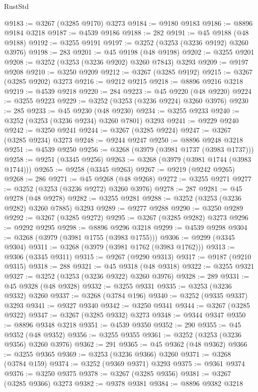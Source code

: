 \begin{lexlean}{RustStd}
\begin{coremodule}
{\begin{coremodule}
{{{{{{{{{{{{{{{{{{{{{{{{{{{{{{{{{{{{{{{@9183 := @3267 (@3285 @9170) @3273
@9184 := @9180 @9183
@9186 := @8896 @9184 @3218
@9187 := @4539 @9186
@9188 := 282
@9191 := @45 @9188 (@48 @9188)
@9192 := @3255 @9191
@9197 := @3252 (@3253 (@3236 @9192) @3260 @3976)
@9198 := 283
@9201 := @45 @9198 (@48 @9198)
@9202 := @3255 @9201
@9208 := @3252 (@3253 (@3236 @9202) @3260 @7843) @3293
@9209 := @9197 @9208
@9210 := @3250 @9209
@9212 := @3267 (@3285 @9192)
@9215 := @3267 (@3285 @9202) @3273
@9216 := @9212 @9215
@9218 := @8896 @9216 @3218
@9219 := @4539 @9218
@9220 := 284
@9223 := @45 @9220 (@48 @9220)
@9224 := @3255 @9223
@9229 := @3252 (@3253 (@3236 @9224) @3260 @3976)
@9230 := 285
@9233 := @45 @9230 (@48 @9230)
@9234 := @3255 @9233
@9240 := @3252 (@3253 (@3236 @9234) @3260 @7801) @3293
@9241 := @9229 @9240
@9242 := @3250 @9241
@9244 := @3267 (@3285 @9224)
@9247 := @3267 (@3285 @9234) @3273
@9248 := @9244 @9247
@9250 := @8896 @9248 @3218
@9251 := @4539 @9250
@9256 := @3268 (@3979 (@3981 @1737 (@3983 @1737)))
@9258 := @9251 (@3345 @9256)
@9263 := @3268 (@3979 (@3981 @1744 (@3983 @1744)))
@9265 := @9258 (@3345 @9263)
@9267 := @9219 (@9242 @9265)
@9268 := 286
@9271 := @45 @9268 (@48 @9268)
@9272 := @3255 @9271
@9277 := @3252 (@3253 (@3236 @9272) @3260 @3976)
@9278 := 287
@9281 := @45 @9278 (@48 @9278)
@9282 := @3255 @9281
@9288 := @3252 (@3253 (@3236 @9282) @3260 @7885) @3293
@9289 := @9277 @9288
@9290 := @3250 @9289
@9292 := @3267 (@3285 @9272)
@9295 := @3267 (@3285 @9282) @3273
@9296 := @9292 @9295
@9298 := @8896 @9296 @3218
@9299 := @4539 @9298
@9304 := @3268 (@3979 (@3981 @1755 (@3983 @1755)))
@9306 := @9299 (@3345 @9304)
@9311 := @3268 (@3979 (@3981 @1762 (@3983 @1762)))
@9313 := @9306 (@3345 @9311)
@9315 := @9267 (@9290 @9313)
@9317 := @9187 (@9210 @9315)
@9318 := 288
@9321 := @45 @9318 (@48 @9318)
@9322 := @3255 @9321
@9327 := @3252 (@3253 (@3236 @9322) @3260 @3976)
@9328 := 289
@9331 := @45 @9328 (@48 @9328)
@9332 := @3255 @9331
@9335 := @3253 (@3236 @9332) @3260
@9337 := @3268 (@3784 @196)
@9340 := @3252 (@9335 @9337) @3293
@9341 := @9327 @9340
@9342 := @3250 @9341
@9344 := @3267 (@3285 @9322)
@9347 := @3267 (@3285 @9332) @3273
@9348 := @9344 @9347
@9350 := @8896 @9348 @3218
@9351 := @4539 @9350
@9352 := 290
@9355 := @45 @9352 (@48 @9352)
@9356 := @3255 @9355
@9361 := @3252 (@3253 (@3236 @9356) @3260 @3976)
@9362 := 291
@9365 := @45 @9362 (@48 @9362)
@9366 := @3255 @9365
@9369 := @3253 (@3236 @9366) @3260
@9371 := @3268 (@3784 @159)
@9374 := @3252 (@9369 @9371) @3293
@9375 := @9361 @9374
@9376 := @3250 @9375
@9378 := @3267 (@3285 @9356)
@9381 := @3267 (@3285 @9366) @3273
@9382 := @9378 @9381
@9384 := @8896 @9382 @3218
}}}}}}}}}}}}}}}}}}}}}}}}}}}}}}}}}}}}}}}
\end{coremodule}}
\end{coremodule}
\end{lexlean}
